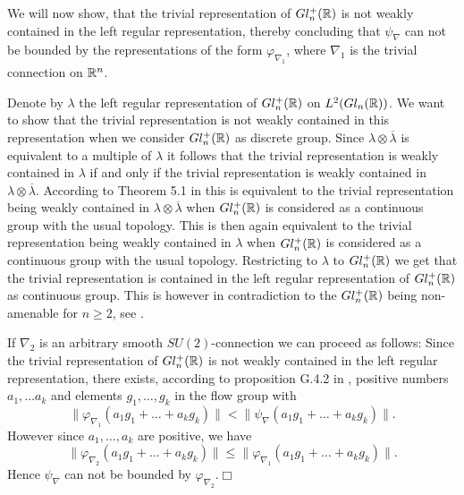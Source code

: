 \documentclass[12pt]{article}
\def\ca{{\cal A}}
\def\ch{{\cal H}}
\newcommand{\bbR}{{\Bbb R}}
\begin{document}
We will now show, that the trivial representation of $Gl_n^+(\bbR)$ is not weakly contained in the left regular representation, thereby concluding that $\psi_\nabla$ can not be bounded by  the representations of the form $\varphi_{\nabla_1}$, where $\nabla_1$ is the trivial connection on $\bbR^n$. 

Denote by $\lambda$ the left regular representation of  $ Gl_n^+ (\bbR )$ on $L^2 (Gl_n(\bbR ))$.  We want to show that the trivial representation is not weakly contained in this representation when we consider $Gl_n^+(\bbR )$ as discrete group. Since $\lambda \otimes \overline{\lambda} $ is equivalent to a multiple of $\lambda$ it follows that the trivial representation is weakly contained in $\lambda$ if and only if the trivial representation is weakly contained in   $\lambda \otimes \overline{\lambda} $. According to Theorem 5.1 in \cite{Bekka} this is equivalent to the trivial representation being weakly contained in  $\lambda \otimes \overline{\lambda} $ when $Gl_n^+(\bbR )$ is considered as a continuous group with the usual topology. This is then again equivalent to the trivial representation being weakly contained in $\lambda$   when $Gl_n^+(\bbR )$ is considered as a continuous group with the usual topology. Restricting to $\lambda$ to $Gl_n^+(\bbR )$ we get that the trivial representation is contained in the left regular representation of  $Gl_n^+(\bbR )$ as continuous group.   This is however in contradiction to the $Gl_n^+(\bbR )$ being non-amenable  for $n\geq 2$, see \cite{Greenleaf}. %

If $\nabla_2$ is an arbitrary  smooth $SU(2)$-connection we can proceed as follows: Since the trivial representation of $Gl_n^+(\bbR)$ is not weakly contained in the left regular representation, there exists, according to proposition G.4.2 in \cite{Bekka2},   positive numbers $a_1,\ldots a_k$ and elements $g_1,\ldots , g_k$ in the flow group with 
$$ \| \varphi_{\nabla_1}(a_1g_1+\ldots +a_kg_k)\| <\|\psi_\nabla (a_1g_1+\ldots +a_kg_k)\|  .  $$
However since $a_1,\ldots ,a_k$ are positive, we have 
$$ \| \varphi_{\nabla_2}(a_1g_1+\ldots +a_kg_k)\| \leq \| \varphi_{\nabla_1}(a_1g_1+\ldots +a_kg_k)\|  .$$
Hence $\psi_\nabla $ can not be bounded by  $\varphi_{\nabla_2}$.\hfill $\Box$ 

\end{document}
